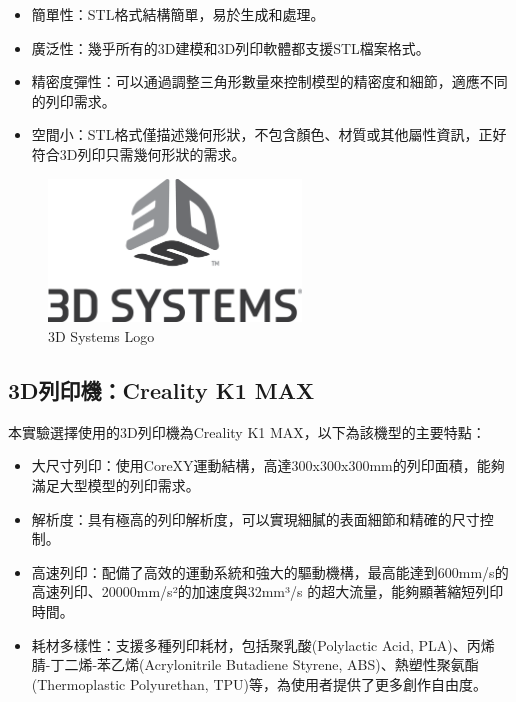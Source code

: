 \documentclass[class=NCU_thesis, crop=false]{standalone}
\begin{document}
\begin{itemize}
    \item 簡單性：STL格式結構簡單，易於生成和處理。
    \item 廣泛性：幾乎所有的3D建模和3D列印軟體都支援STL檔案格式。
    \item 精密度彈性：可以通過調整三角形數量來控制模型的精密度和細節，適應不同的列印需求。
    \item 空間小：STL格式僅描述幾何形狀，不包含顏色、材質或其他屬性資訊，正好符合3D列印只需幾何形狀的需求。
\end{itemize}

\begin{figure}[htbp]
    \centering
    \includegraphics[width=0.6\textwidth]{figures/3D_Systems_Logo.png}
\caption{3D Systems Logo~\cite{3dsystems_echo_dot}}
\end{figure}

\subsection{3D列印機：Creality K1 MAX}
本實驗選擇使用的3D列印機為Creality K1 MAX，以下為該機型的主要特點：
\begin{itemize}
    \item 大尺寸列印：使用CoreXY運動結構，高達300x300x300mm的列印面積，能夠滿足大型模型的列印需求。
    \item 解析度：具有極高的列印解析度，可以實現細膩的表面細節和精確的尺寸控制。
    \item 高速列印：配備了高效的運動系統和強大的驅動機構，最高能達到600mm/s的高速列印、20000mm/s²的加速度與32mm³/s 的超大流量，能夠顯著縮短列印時間。
    \item 耗材多樣性：支援多種列印耗材，包括聚乳酸(Polylactic Acid, PLA)、丙烯腈-丁二烯-苯乙烯(Acrylonitrile Butadiene Styrene, ABS)、熱塑性聚氨酯(Thermoplastic Polyurethan, TPU)等，為使用者提供了更多創作自由度。
\end{itemize}
\end{document}
